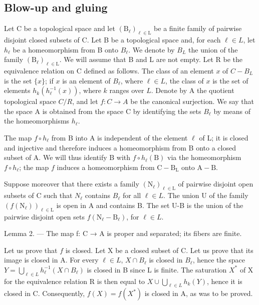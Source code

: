 \subsection{Blow-up and gluing}

Let C be a topological space and let \((\mathrm{B}_{\ell})_{\ell\in\mathrm{L}}\) be a finite family of pairwise disjoint closed subsets of C. Let B be a topological space and, for each \(\ell\in L\), let \(h_{\ell}\) be a homeomorphism from B onto \(B_{\ell}\). We denote by \(B_{L}\) the union of the family \((\mathrm{B}_{\ell})_{\ell\in\mathrm{L}}\). We will assume that B and L are not empty. Let R be the equivalence relation on C defined as follows. The class of an element \(x\) of \(C - B_L\) is the set \(\{x\}\); if \(x\) is an element of \(B_\ell\), where \(\ell \in L\), the class of \(x\) is the set of elements \(h_k(h_\ell^{-1}(x))\), where \(k\) ranges over \(L\). Denote by A the quotient topological space \(C/R\), and let \(f: C \to A\) be the canonical surjection. We say that the space A is obtained from the space C by identifying the sets \(B_\ell\) by means of the homeomorphisms \(h_\ell\).

The map \(f \circ h_{\ell}\) from B into A is independent of the element \(\ell\) of L; it is closed and injective and therefore induces a homeomorphism from B onto a closed subset of A. We will thus identify B with \(f \circ h_{\ell}(\mathrm{B})\) via the homeomorphism \(f \circ h_{\ell}\); the map \(f\) induces a homeomorphism from \(\mathrm{C} - \mathrm{B}_{\mathrm{L}}\) onto \(\mathrm{A} - \mathrm{B}\).

Suppose moreover that there exists a family \((\mathrm{N}_{\ell})_{\ell\in\mathrm{L}}\) of pairwise disjoint open subsets of C such that \(N_{\ell}\) contains \(B_{\ell}\) for all \(\ell\in L\). The union U of the family \((f(\mathrm{N}_{\ell}))_{\ell\in\mathrm{L}}\) is open in A and contains B. The set U-B is the union of the pairwise disjoint open sets \(f(\mathrm{N}_{\ell}-\mathrm{B}_{\ell})\), for \(\ell\in L\).

Lemma 2. --- The map f: C → A is proper and separated; its fibers are finite.

Let us prove that \(f\) is closed. Let X be a closed subset of C. Let us prove that its image is closed in A. For every \(\ell \in L\), \(X \cap B_{\ell}\) is closed in \(B_{\ell}\), hence the space \(Y = \bigcup_{\ell \in L} h_{\ell}^{-1}(X \cap B_{\ell})\) is closed in B since L is finite. The saturation \(X^{*}\) of X for the equivalence relation R is then equal to \(X \cup \bigcup_{\ell \in L} h_{k}(Y)\), hence it is closed in C. Consequently, \(f(X) = f(X^{*})\) is closed in A, as was to be proved.


